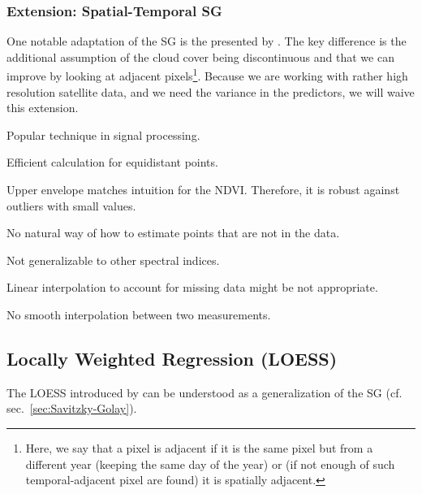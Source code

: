 		\subsubsection*{Extension: Spatial-Temporal SG}
			One notable adaptation of the SG is the presented by \cite{caoSimpleMethodImprove2018b}. The key difference is the additional assumption of the cloud cover being discontinuous and that we can improve by looking at adjacent pixels\footnote{Here, we say that a pixel is adjacent if it is the same pixel but from a different year (keeping the same day of the year) or (if not enough of such temporal-adjacent pixel are found) it is spatially adjacent.}. Because we are working with rather high resolution satellite data, and we need the variance in the predictors, we will waive this extension.

		\begin{my_pros_cons_table}{
				\item Popular technique in signal processing.
				\item Efficient calculation for equidistant points.
				\item Upper envelope matches intuition for the NDVI. Therefore, it is robust against outliers with small values.
			}{
				\item No natural way of how to estimate points that are not in the data.
				\item Not generalizable to other spectral indices.
				\item Linear interpolation to account for missing data might be not appropriate.
				\item No smooth interpolation between two measurements.
			}
		\end{my_pros_cons_table}


	\subsection{Locally Weighted Regression (LOESS)}
		\label{sec:loess}

		The LOESS introduced by \cite{clevelandRobustLocallyWeighted1979} can be understood as a generalization of the SG (cf. sec.~\ref{sec:Savitzky-Golay}).

